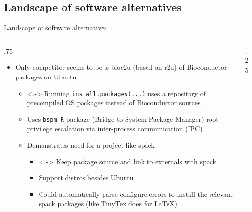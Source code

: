 \documentclass[
aspectratio=169,
xcolor={usenames}
]{beamer}
\begin{document}
\subsection{Landscape of software alternatives}
\begin{frame}{Landscape of software alternatives}
  \begin{columns}[T]
    \begin{column}{.75\framewidth}
      \begin{itemize}[<+->]
      \item Only competitor seems to be %
        is bioc2u (based on r2u) %
        of Bioconductor packages on Ubuntu
        \begin{itemize}
        \item<.-> Running %
          \texttt{install.packages(...)} %
          uses a repository of
          \ul{precompiled OS packages} instead of Bioconductor sources
        \item Uses \texttt{bspm R} package (Bridge to System Package Manager)
          root privilege escalation via inter-process communication (IPC)
        \item Demonstrates need for a project like spack
          \begin{itemize}
          \item<.-> Keep package source and link to externals with spack
          \item Support distros besides Ubuntu
          \item Could automatically parse configure errors %
            to install the relevant spack packages %
            (like TinyTex does for LaTeX)
          \end{itemize}
        \end{itemize}
      \end{itemize}
    \end{column}
    \begin{column}{.25\framewidth}
\end{column}
\end{columns}
\end{frame}
\end{document}
